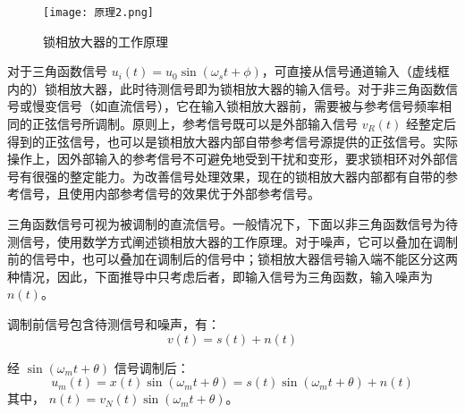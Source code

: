 \documentclass[dvipsnames, svgnames,a4paper,11pt]{article}
\begin{document}
\begin{figure}[{H}]
	\centering
	\texttt{[image: 原理2.png]}
	\caption{锁相放大器的工作原理}
	\label{}
\end{figure}


对于三角函数信号 \(u_i(t) = u_0 \sin (\omega_s t + \phi)\)，可直接从信号通道输入（虚线框内的）锁相放大器，此时待测信号即为锁相放大器的输入信号。对于非三角函数信号或慢变信号（如直流信号），它在输入锁相放大器前，需要被与参考信号频率相同的正弦信号所调制。原则上，参考信号既可以是外部输入信号 \(v_R(t)\) 经整定后得到的正弦信号，也可以是锁相放大器内部自带参考信号源提供的正弦信号。实际操作上，因外部输入的参考信号不可避免地受到干扰和变形，要求锁相环对外部信号有很强的整定能力。为改善信号处理效果，现在的锁相放大器内部都有自带的参考信号，且使用内部参考信号的效果优于外部参考信号。

三角函数信号可视为被调制的直流信号。一般情况下，下面以非三角函数信号为待测信号，使用数学方式阐述锁相放大器的工作原理。对于噪声，它可以叠加在调制前的信号中，也可以叠加在调制后的信号中；锁相放大器信号输入端不能区分这两种情况，因此，下面推导中只考虑后者，即输入信号为三角函数，输入噪声为 \(n(t)\)。

调制前信号包含待测信号和噪声，有：
\begin{equation}
    v(t) = s(t) + n(t)
\end{equation}

经 \(\sin (\omega_m t + \theta)\) 信号调制后：
\begin{equation}
    u_m(t) = x(t) \sin (\omega_m t + \theta) = s(t) \sin (\omega_m t + \theta) + n(t)
\end{equation}
其中， \(n(t) = v_N(t) \sin (\omega_m t + \theta)\)。
\end{document}

